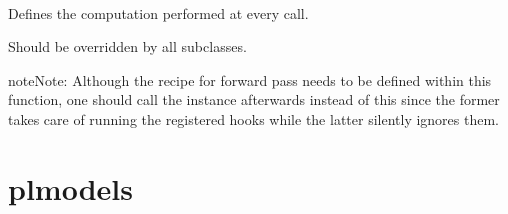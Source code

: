 \documentclass[letterpaper,10pt,english]{sphinxmanual}
\begin{document}

\begin{fulllineitems}
\label{\detokenize{pages/ml:vipercore.ml.models.GolgiVGG}}~

\begin{fulllineitems}
\label{\detokenize{pages/ml:vipercore.ml.models.GolgiVGG.forward}}
\sphinxAtStartPar
Defines the computation performed at every call.

\sphinxAtStartPar
Should be overridden by all subclasses.

\begin{sphinxadmonition}{note}{Note:}
\sphinxAtStartPar
Although the recipe for forward pass needs to be defined within
this function, one should call the  instance afterwards
instead of this since the former takes care of running the
registered hooks while the latter silently ignores them.
\end{sphinxadmonition}

\end{fulllineitems}


\end{fulllineitems}



\section{plmodels}
\label{\detokenize{pages/ml:module-vipercore.ml.plmodels}}\label{\detokenize{pages/ml:plmodels}}
\end{document}
